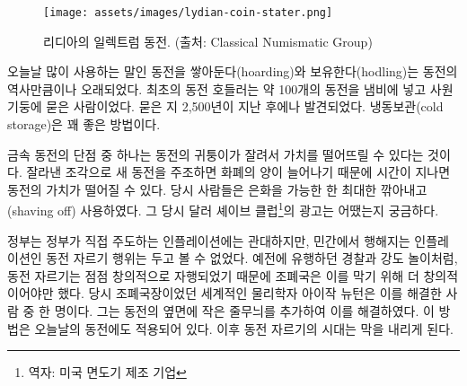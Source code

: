 \newpage

\begin{figure}
  \centering
  \texttt{[image: assets/images/lydian-coin-stater.png]}
  \caption{리디아의 일렉트럼 동전. (출처: Classical Numismatic Group)}
  \label{fig:lydian-coin-stater}
\end{figure}

\begin{comment}
Turns out that hoarding coins, or hodling, to use today's parlance, is
almost as old as coins. The earliest coin hodler was someone who put
almost a hundred of these coins in a pot and buried it in the
foundations of a temple, only to be found 2500 years later. Pretty good
cold storage if you ask me.
\end{comment}
오늘날 많이 사용하는 말인 동전을 쌓아둔다(hoarding)와 보유한다(hodling)는 
동전의 역사만큼이나 오래되었다.
최초의 동전 호들러는 약 100개의 동전을 냄비에 넣고 사원 기둥에 묻은 사람이었다. 
묻은 지 2,500년이 지난 후에나 발견되었다.
냉동보관(cold storage)은 꽤 좋은 방법이다.

\begin{comment}
One of the downsides of using precious metal coins is that they can be
clipped, effectively debasing the value of the coin. New coins can be
minted from the clippings, inflating the money supply over time,
devaluing every individual coin in the process. People were literally
shaving off as much as they could get away with of their silver dollars.
I wonder what kind of \textit{Dollar Shave Club} advertisements they had back
in the day.
\end{comment}
금속 동전의 단점 중 하나는 동전의 귀퉁이가 잘려서 가치를 떨어뜨릴 수 있다는 것이다. 
잘라낸 조각으로 새 동전을 주조하면 화폐의 양이 늘어나기 때문에 시간이 지나면 동전의 가치가 떨어질 수 있다.
당시 사람들은 은화을 가능한 한 최대한 깎아내고(shaving off) 사용하였다.
그 당시 달러 셰이브 클럽\footnote{역자: 미국 면도기 제조 기업}의 광고는 어땠는지 궁금하다.

\begin{comment}
Since governments are only cool with inflation if they are the ones
doing it, efforts were made to stop this guerrilla debasement. In
classic cops-and-robbers fashion, coin clippers got ever more creative
with their techniques, forcing the \enquote{masters of the mint} to get even
more creative with their countermeasures. Isaac Newton, the
world-renowned physicist of \textit{Principia Mathematica} fame, used to be one
of these masters. He is attributed with adding the small stripes at the
side of coins which are still present today. Gone were the days of easy
coin shaving.
\end{comment}
정부는 정부가 직접 주도하는 인플레이션에는 관대하지만, 
민간에서 행해지는 인플레이션인 동전 자르기 행위는 두고 볼 수 없었다. 
예전에 유행하던 경찰과 강도 놀이처럼, 
동전 자르기는 점점 창의적으로 자행되었기 때문에 조폐국은 이를 막기 위해 더 창의적이어야만 했다.
당시 조폐국장이었던 세계적인 물리학자 아이작 뉴턴은 이를 해결한 사람 중 한 명이다. 
그는 동전의 옆면에 작은 줄무늬를 추가하여 이를 해결하였다. 
이 방법은 오늘날의 동전에도 적용되어 있다. 
이후 동전 자르기의 시대는 막을 내리게 된다.

